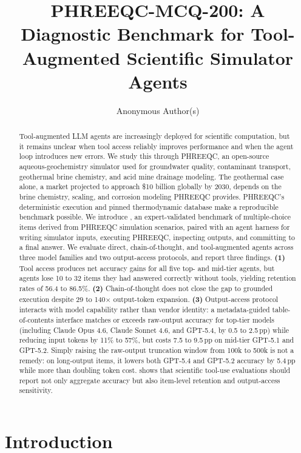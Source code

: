 \documentclass{article}
\title{PHREEQC-MCQ-200: A Diagnostic Benchmark for Tool-Augmented Scientific Simulator Agents}
\author{Anonymous Author(s)}
\begin{document}
\maketitle

\begin{abstract}
Tool-augmented LLM agents are increasingly deployed for scientific computation, but it remains unclear when tool access reliably improves performance and when the agent loop introduces new errors. We study this through PHREEQC, an open-source aqueous-geochemistry simulator used for groundwater quality, contaminant transport, geothermal brine chemistry, and acid mine drainage modeling. The geothermal case alone, a market projected to approach \$10 billion globally by 2030, depends on the brine chemistry, scaling, and corrosion modeling PHREEQC provides. PHREEQC's deterministic execution and pinned thermodynamic database make a reproducible benchmark possible. We introduce \BenchName, an expert-validated benchmark of \BenchN{} multiple-choice items derived from \BenchScenarioN{} PHREEQC simulation scenarios, paired with an agent harness for writing simulator inputs, executing PHREEQC, inspecting outputs, and committing to a final answer. We evaluate direct, chain-of-thought, and tool-augmented agents across three model families and two output-access protocols, and report three findings. \textbf{(1)} Tool access produces net accuracy gains for all five top- and mid-tier agents, but agents lose 10 to 32 items they had answered correctly without tools, yielding retention rates of 56.4 to 86.5\%. \textbf{(2)} Chain-of-thought does not close the gap to grounded execution despite 29 to 140$\times$ output-token expansion. \textbf{(3)} Output-access protocol interacts with model capability rather than vendor identity: a metadata-guided table-of-contents interface matches or exceeds raw-output accuracy for top-tier models (including Claude Opus 4.6, Claude Sonnet 4.6, and GPT-5.4, by 0.5 to 2.5\,pp) while reducing input tokens by 11\% to 57\%, but costs 7.5 to 9.5\,pp on mid-tier GPT-5.1 and GPT-5.2. Simply raising the raw-output truncation window from 100k to 500k is not a remedy: on long-output items, it lowers both GPT-5.4 and GPT-5.2 accuracy by 5.4\,pp while more than doubling token cost. \BenchName{} shows that scientific tool-use evaluations should report not only aggregate accuracy but also item-level retention and output-access sensitivity.
\end{abstract}

\section{Introduction}
\end{document}
